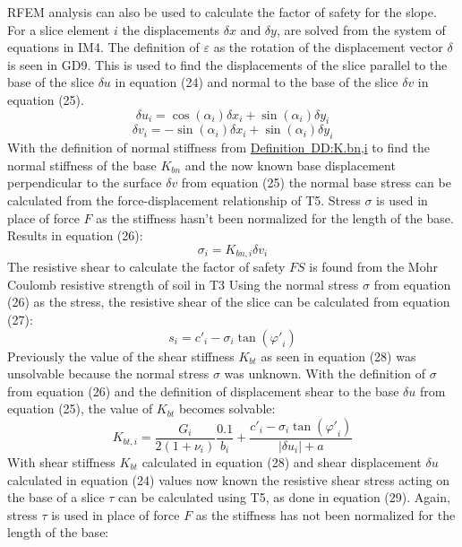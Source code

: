 \documentclass[12pt]{article}
\begin{document}
RFEM analysis can also be used to calculate the factor of safety for the slope. For a slice element $i$ the displacements $δx$ and $δy$, are solved from the system of equations in IM4. The definition of $ε$ as the rotation of the displacement vector $δ$ is seen in GD9. This is used to find the displacements of the slice parallel to the base of the slice $δu$ in equation (24) and normal to the base of the slice $δv$ in equation (25).
\begin{dmath}
{δu}_{i}=\cos\left(α_{i}\right) {δx}_{i}+\sin\left(α_{i}\right) {δy}_{i}
\end{dmath}
\begin{dmath}
{δv}_{i}=-\sin\left(α_{i}\right) {δx}_{i}+\sin\left(α_{i}\right) {δy}_{i}
\end{dmath}
With the definition of normal stiffness from \hyperref[DD:K.bn,i]{Definition~DD:K.bn,i} to find the normal stiffness of the base ${K_{bn}}$ and the now known base displacement perpendicular to the surface $δv$ from equation (25) the normal base stress can be calculated from the force-displacement relationship of T5. Stress $σ$ is used in place of force $F$ as the stiffness hasn't been normalized for the length of the base. Results in equation (26):
\begin{dmath}
σ_{i}={K_{bn,i}} {δv}_{i}
\end{dmath}
The resistive shear to calculate the factor of safety $FS$ is found from the Mohr Coulomb resistive strength of soil in T3 Using the normal stress $σ$ from equation (26) as the stress, the resistive shear of the slice can be calculated from equation (27):
\begin{dmath}
s_{i}={c'}_{i}-σ_{i} \tan\left({φ'}_{i}\right)
\end{dmath}
Previously the value of the shear stiffness ${K_{bt}}$ as seen in equation (28) was unsolvable because the normal stress $σ$ was unknown. With the definition of $σ$ from equation (26) and the definition of displacement shear to the base $δu$ from equation (25), the value of ${K_{bt}}$ becomes solvable:
\begin{dmath}
{K_{bt,i}}=\frac{G_{i}}{2 \left(1+ν_{i}\right)} \frac{0.1}{b_{i}}+\frac{{c'}_{i}-σ_{i} \tan\left({φ'}_{i}\right)}{|{δu}_{i}|+a}
\end{dmath}
With shear stiffness ${K_{bt}}$ calculated in equation (28) and shear displacement $δu$ calculated in equation (24) values now known the resistive shear stress acting on the base of a slice $τ$ can be calculated using T5, as done in equation (29). Again, stress $τ$ is used in place of force $F$ as the stiffness has not been normalized for the length of the base:
\end{document}
